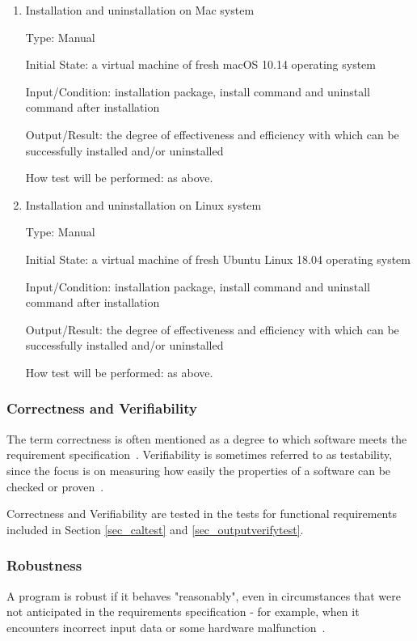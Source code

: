 \documentclass[12pt, titlepage]{article}
\begin{document}
\begin{enumerate}
\item{Installation and uninstallation on Mac system}

Type: Manual
					
Initial State: a virtual machine of fresh macOS 10.14 operating system
					
Input/Condition: \progname{} installation package, install command and uninstall
command after installation
					
Output/Result: the degree of effectiveness and efficiency with which \progname{}
can be successfully installed and/or uninstalled
					
How test will be performed: as above.

\item{Installation and uninstallation on Linux system}

Type: Manual
					
Initial State: a virtual machine of fresh Ubuntu Linux 18.04 operating system
					
Input/Condition: \progname{} installation package, install command and uninstall
command after installation
					
Output/Result: the degree of effectiveness and efficiency with which \progname{}
can be successfully installed and/or uninstalled
					
How test will be performed: as above.
\end{enumerate}

\subsubsection{Correctness and Verifiability}
\label{sec_correctverfiabletest}

The term correctness is often mentioned as a degree to which software meets the
requirement specification~\cite{IEEE1990}.  Verifiability is sometimes referred
to as testability, since the focus is on measuring how easily the properties of
a software can be checked or proven~\cite{SmithEtAl2018}.
		
Correctness and Verifiability are tested in the tests for functional
requirements included in Section \ref{sec_caltest} and
\ref{sec_outputverifytest}.

\subsubsection{Robustness}
\label{sec_robustnesstest} A program is robust if it behaves "reasonably", even
in circumstances that were not anticipated in the requirements specification -
for example, when it encounters incorrect input data or some hardware
malfunction~\cite{Ghezzi1991}.
\end{document}
